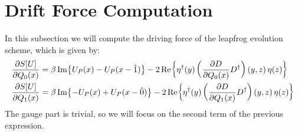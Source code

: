 \chapter{Drift Force Computation}
\label{app:b}
In this subsection we will compute the driving force of the leapfrog evolution scheme, which is given by:
\begin{equation*}
\begin{split}
    \pdv{S[U]}{Q_0(x)} &= \beta \Im{U_P(x) - U_P(x - \hat{1})} - 2 \Re{\eta^\dagger(y) \left(\pdv{D}{Q_0(x)}D^\dagger\right) (y,z)\, \eta(z)}   \\
    \pdv{S[U]}{Q_1(x)} &= \beta \Im{- U_P(x) + U_P(x - \hat{0})} - 2 \Re{\eta^\dagger(y) \left(\pdv{D}{Q_1(x)}D^\dagger\right) (y,z)\, \eta(z)} 
\end{split}
\end{equation*}
The gauge part is trivial, so we will focus on the second term of the previous expression.
